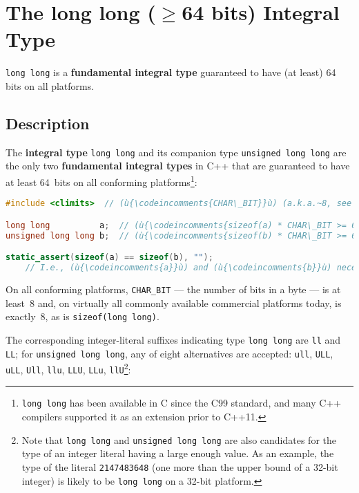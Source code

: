 \newpage
\section[{\tt long} {\tt long}]{The {\SecCode long} {\SecCode long} ($\geq$64 bits) Integral Type}\label{long-long}


\texttt{long long} is a \textbf{fundamental integral type} guaranteed to have (at least) 64 bits on all
platforms.

\subsection[Description]{Description}\label{description}

The \textbf{integral type} \texttt{long}~\texttt{long} and its companion
type \texttt{unsigned}~\texttt{long}~\texttt{long} are the only two
\textbf{fundamental integral types} in C++ that are guaranteed to have
at least 64~bits on all conforming platforms{\cprotect\footnote{\texttt{long}~\texttt{long}
has been available in C since the C99 standard, and many C++ compilers
  supported it as an extension prior to C++11.}}:

\begin{lstlisting}[language=C++]
#include <climits>  // (ù{\codeincomments{CHAR\_BIT}}ù) (a.k.a.~8, see below)

long long          a;  // (ù{\codeincomments{sizeof(a) * CHAR\_BIT >= 64}}ù)
unsigned long long b;  // (ù{\codeincomments{sizeof(b) * CHAR\_BIT >= 64}}ù)

static_assert(sizeof(a) == sizeof(b), "");
    // I.e., (ù{\codeincomments{a}}ù) and (ù{\codeincomments{b}}ù) necessarily have the same size in every program.
\end{lstlisting}

\noindent On all conforming platforms, \texttt{CHAR\_BIT} --- the number of bits
in a byte --- is at least~8 and, on virtually all commonly available
commercial platforms today, is exactly~8, as is
\texttt{sizeof(long}~\texttt{long)}.

The corresponding integer-literal suffixes indicating type
\texttt{long}~\texttt{long} are \texttt{ll} and \texttt{LL}; for
\texttt{unsigned}~\texttt{long}~\texttt{long}, any of eight alternatives
are accepted: \texttt{ull}, \texttt{ULL}, \texttt{uLL}, \texttt{Ull},
\texttt{llu}, \texttt{LLU}, \texttt{LLu},
\texttt{llU}{\cprotect\footnote{Note that \texttt{long}~\texttt{long}
and \texttt{unsigned}~\texttt{long}~\texttt{long} are also candidates
for the type of an integer literal having a large enough value. As an
example, the type of the literal \texttt{2147483648} (one more than
the upper bound of a 32-bit integer) is likely to be
  \texttt{long}~\texttt{long} on a 32-bit platform.}}:

